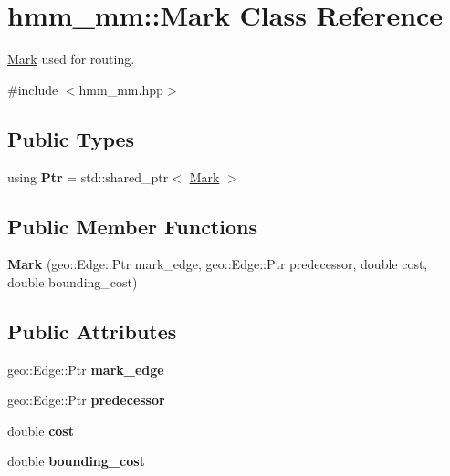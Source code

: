 \hypertarget{classhmm__mm_1_1Mark}{}\section{hmm\+\_\+mm\+:\+:Mark Class Reference}
\label{classhmm__mm_1_1Mark}


\hyperlink{classhmm__mm_1_1Mark}{Mark} used for routing.  




{\ttfamily \#include $<$hmm\+\_\+mm.\+hpp$>$}

\subsection*{Public Types}
\begin{DoxyCompactItemize}
\item 
using {\bfseries Ptr} = std\+::shared\+\_\+ptr$<$ \hyperlink{classhmm__mm_1_1Mark}{Mark} $>$\hypertarget{classhmm__mm_1_1Mark_a2f6ed3246a19eed051b0922c4f2cb309}{}\label{classhmm__mm_1_1Mark_a2f6ed3246a19eed051b0922c4f2cb309}

\end{DoxyCompactItemize}
\subsection*{Public Member Functions}
\begin{DoxyCompactItemize}
\item 
{\bfseries Mark} (geo\+::\+Edge\+::\+Ptr mark\+\_\+edge, geo\+::\+Edge\+::\+Ptr predecessor, double cost, double bounding\+\_\+cost)\hypertarget{classhmm__mm_1_1Mark_a5b87a7105bd09af133ee0dc7bd7615b2}{}\label{classhmm__mm_1_1Mark_a5b87a7105bd09af133ee0dc7bd7615b2}

\end{DoxyCompactItemize}
\subsection*{Public Attributes}
\begin{DoxyCompactItemize}
\item 
geo\+::\+Edge\+::\+Ptr {\bfseries mark\+\_\+edge}\hypertarget{classhmm__mm_1_1Mark_a81a92d074c7b4ff9c98cde367d0e294f}{}\label{classhmm__mm_1_1Mark_a81a92d074c7b4ff9c98cde367d0e294f}

\item 
geo\+::\+Edge\+::\+Ptr {\bfseries predecessor}\hypertarget{classhmm__mm_1_1Mark_a2a9ffe974a2508f425d8f399c66a6b68}{}\label{classhmm__mm_1_1Mark_a2a9ffe974a2508f425d8f399c66a6b68}

\item 
double {\bfseries cost}\hypertarget{classhmm__mm_1_1Mark_a127678a9257842e1478d2e17efad4860}{}\label{classhmm__mm_1_1Mark_a127678a9257842e1478d2e17efad4860}

\item 
double {\bfseries bounding\+\_\+cost}\hypertarget{classhmm__mm_1_1Mark_a9e7a0a3fe07720ecd17e698e2d6fc16f}{}\label{classhmm__mm_1_1Mark_a9e7a0a3fe07720ecd17e698e2d6fc16f}

\end{DoxyCompactItemize}


